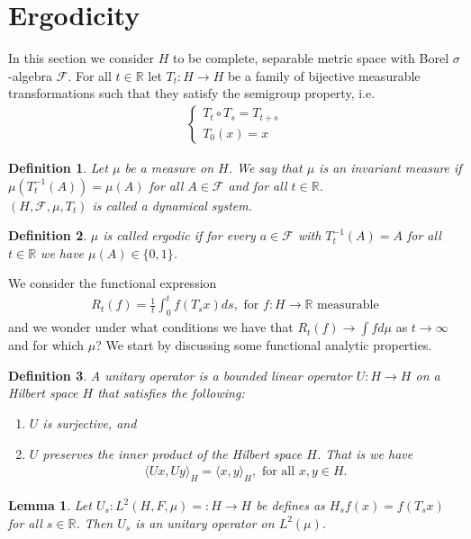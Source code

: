 \documentclass[11pt,a4paper, final]{article}
\newtheorem{lem}{Lemma}[section]
\newtheorem{defn}{Definition}[section]
\theoremstyle{definition}
\begin{document}
\section{Ergodicity}
In this section we consider $H$ to be complete, separable metric space with Borel $\sigma$-algebra $\mathcal{F}$. For all $t \in \mathbb{R}$ let $T_t : H \to H$ be a family of bijective measurable transformations such that they satisfy the semigroup property, i.e.
\begin{align*}
\begin{cases} T_t \circ T_s = T_{t+s} \\ T_0(x) = x \end{cases}
\end{align*}
\begin{defn} Let $\mu$ be a measure on $H$. We say that $\mu$ is an invariant measure if $\mu (T_t^{-1}(A))= \mu (A)$ for all $A \in \mathcal{F}$ and for all $t \in \mathbb{R}$. \\  $(H, \mathcal{F},  \mu , T_t) $ is called a dynamical system. 
\end{defn}
\begin{defn} $\mu$ is called ergodic if for every $a \in \mathcal{F}$ with $T_t^{-1}(A)=A$ for all $t \in \mathbb{R}$ we have  $\mu(A) \in \lbrace 0 ,1 \rbrace $. 
\end{defn}
\noindent We consider the functional expression
\begin{align*}
R_t(f) = \frac{1}{t} \int_0^t f(T_sx)ds, \text{ for } f : H \to \mathbb{R} \text{ measurable}
\end{align*}
and we wonder under what conditions we have that $R_t(f) \to \int f d \mu$ as $t \to \infty$ and for which $\mu$? We start by discussing some functional analytic properties.
\begin{defn} A unitary operator is a bounded linear operator $U: H \to H$ on a Hilbert space $H$ that satisfies the following:
\begin{enumerate}
\item $U$ is surjective, and 
\item $U$ preserves the inner product of the Hilbert space $H$. That is we have 
\begin{align*}
\langle Ux, Uy \rangle_H = \langle x, y \rangle_H, \text{ for all } x,y \in H. 
\end{align*}
\end{enumerate}
\end{defn}
\begin{lem} Let $U_s : L^2(H, F, \mu)=:H \to H$ be defines as $H_sf(x)=f(T_sx)$ for all $s \in \mathbb{R}$. Then $U_s$ is an unitary operator on $L^2( \mu)$.
\end{lem}
\end{document}
